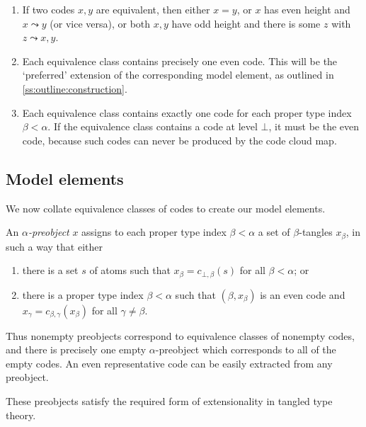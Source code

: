 \begin{remarks}\mbox{\negthinspace}
    \begin{enumerate}
        \item If two codes \( x, y \) are equivalent, then either \( x = y \), or \( x \) has even height and \( x \rightcurvedarrow y \) (or vice versa), or both \( x, y \) have odd height and there is some \( z \) with \( z \rightcurvedarrow x, y \).
        \item Each equivalence class contains precisely one even code.
        This will be the `preferred' extension of the corresponding model element, as outlined in \cref{ss:outline:construction}.
        \item Each equivalence class contains exactly one code for each proper type index \( \beta < \alpha \).
        If the equivalence class contains a code at level \( \bot \), it must be the even code, because such codes can never be produced by the code cloud map.
    \end{enumerate}
\end{remarks}

\subsection{Model elements}

We now collate equivalence classes of codes to create our model elements.

\begin{definition}
    An \emph{\( \alpha \)-preobject} \( x \) assigns to each proper type index \( \beta < \alpha \) a set of \( \beta \)-tangles \( x_\beta \), in such a way that either
    \begin{enumerate}
        \item there is a set \( s \) of atoms such that \( x_\beta = c_{\bot,\beta}(s) \) for all \( \beta < \alpha \); or
        \item there is a proper type index \( \beta < \alpha \) such that \( (\beta, x_\beta) \) is an even code and \( x_\gamma = c_{\beta,\gamma}(x_\beta) \) for all \( \gamma \neq \beta \).
    \end{enumerate}
    Thus nonempty preobjects correspond to equivalence classes of nonempty codes, and there is precisely one empty \( \alpha \)-preobject which corresponds to all of the empty codes.
    An even representative code can be easily extracted from any preobject.
\end{definition}

These preobjects satisfy the required form of extensionality in tangled type theory.

